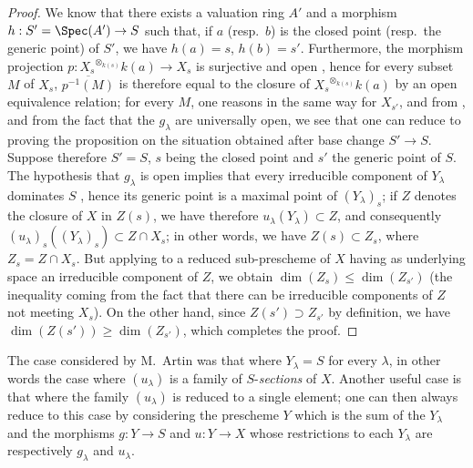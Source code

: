 \begin{proof}
We know  that there exists a valuation ring $A'$ and a morphism $h:S'=\Spec(A')\to S$ such that, if $a$ (resp.\ $b$) is the closed point (resp.\ the generic point) of $S'$, we have $h(a)=s$, $h(b)=s'$.
Furthermore, the morphism projection $p:X_s{}^{\otimes_{k(s)}}k(a)\to X_s$ is surjective and open , hence for every subset $M$ of $X_s$, $\overline{p^{-1}(M)}$ is therefore equal to the closure of $X_s{}^{\otimes_{k(s)}}k(a)$ by an open equivalence relation; for every $M$, one reasons in the same way for $X_{s'}$, and from ,  and from the fact that the $g_\lambda$ are universally open, we see that one can reduce to proving the proposition on the situation obtained after base change $S'\to S$.
Suppose therefore $S'=S$, $s$ being the closed point and $s'$ the generic point of $S$.
The hypothesis that $g_\lambda$ is open implies that every irreducible component of $Y_\lambda$ dominates $S$ , hence its generic point is a maximal point of $(Y_\lambda)_s$; if $Z$ denotes the closure of $X$ in $Z(s)$, we have therefore $u_\lambda(Y_\lambda)\subset Z$, and consequently $(u_\lambda)_s((Y_\lambda)_s)\subset Z\cap X_s$; in other words, we have $Z(s)\subset Z_s$, where $Z_s=Z\cap X_s$.
But applying  to a reduced sub-prescheme of $X$ having as underlying space an irreducible component of $Z$, we obtain $\dim(Z_s)\leq\dim(Z_{s'})$ (the inequality coming from the fact that there can be irreducible components of $Z$ not meeting $X_s$).
On the other hand, since $Z(s')\supset Z_{s'}$ by definition, we have $\dim(Z(s'))\geq\dim(Z_{s'})$, which completes the proof.
\end{proof}

\begin{remark}[14.3.12]
\label{IV.14.3.12}
The case considered by M.\ Artin was that where $Y_\lambda=S$ for every $\lambda$, in other words the case where $(u_\lambda)$ is a family of $S$-\emph{sections} of $X$.
Another useful case is that where the family $(u_\lambda)$ is reduced to a single element; one can then always reduce to this case by considering the prescheme $Y$ which is the sum of the $Y_\lambda$ and the morphisms $g:Y\to S$ and $u:Y\to X$ whose restrictions to each $Y_\lambda$ are respectively $g_\lambda$ and $u_\lambda$.
\end{remark}

